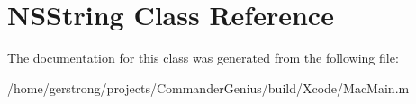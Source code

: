 \hypertarget{class_n_s_string}{
\section{NSString Class Reference}
\label{class_n_s_string}
}


The documentation for this class was generated from the following file:\begin{DoxyCompactItemize}
\item 
/home/gerstrong/projects/CommanderGenius/build/Xcode/MacMain.m\end{DoxyCompactItemize}
